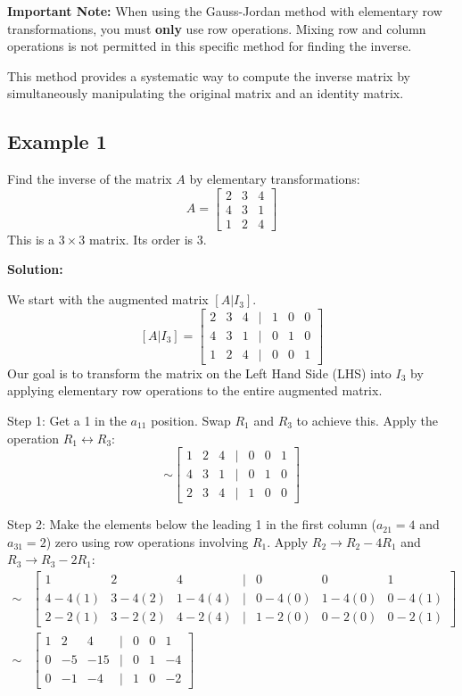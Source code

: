 \documentclass{article}
\begin{document}
\textbf{Important Note:} When using the Gauss-Jordan method with elementary row transformations, you must \textbf{only} use row operations. Mixing row and column operations is not permitted in this specific method for finding the inverse.

This method provides a systematic way to compute the inverse matrix by simultaneously manipulating the original matrix and an identity matrix.

\subsection{Example 1} %
Find the inverse of the matrix $A$ by elementary transformations:
\[ A = \begin{bmatrix} 2 & 3 & 4 \\ 4 & 3 & 1 \\ 1 & 2 & 4 \end{bmatrix} \]
This is a $3 \times 3$ matrix. Its order is 3.

\textbf{Solution:}

We start with the augmented matrix $[A | I_3]$.
\[ [A | I_3] = \begin{bmatrix} 2 & 3 & 4 & | & 1 & 0 & 0 \\ 4 & 3 & 1 & | & 0 & 1 & 0 \\ 1 & 2 & 4 & | & 0 & 0 & 1 \end{bmatrix} \]
Our goal is to transform the matrix on the Left Hand Side (LHS) into $I_3$ by applying elementary row operations to the entire augmented matrix.

Step 1: Get a 1 in the $a_{11}$ position. Swap $R_1$ and $R_3$ to achieve this.
Apply the operation $R_1 \leftrightarrow R_3$:
\[ \sim \begin{bmatrix} 1 & 2 & 4 & | & 0 & 0 & 1 \\ 4 & 3 & 1 & | & 0 & 1 & 0 \\ 2 & 3 & 4 & | & 1 & 0 & 0 \end{bmatrix} \]

Step 2: Make the elements below the leading 1 in the first column ($a_{21}=4$ and $a_{31}=2$) zero using row operations involving $R_1$.
Apply $R_2 \to R_2 - 4R_1$ and $R_3 \to R_3 - 2R_1$:
\begin{align*} \sim &\begin{bmatrix} 1 & 2 & 4 & | & 0 & 0 & 1 \\ 4 - 4(1) & 3 - 4(2) & 1 - 4(4) & | & 0 - 4(0) & 1 - 4(0) & 0 - 4(1) \\ 2 - 2(1) & 3 - 2(2) & 4 - 2(4) & | & 1 - 2(0) & 0 - 2(0) & 0 - 2(1) \end{bmatrix} \\ \sim &\begin{bmatrix} 1 & 2 & 4 & | & 0 & 0 & 1 \\ 0 & -5 & -15 & | & 0 & 1 & -4 \\ 0 & -1 & -4 & | & 1 & 0 & -2 \end{bmatrix}\end{align*}
\end{document}
